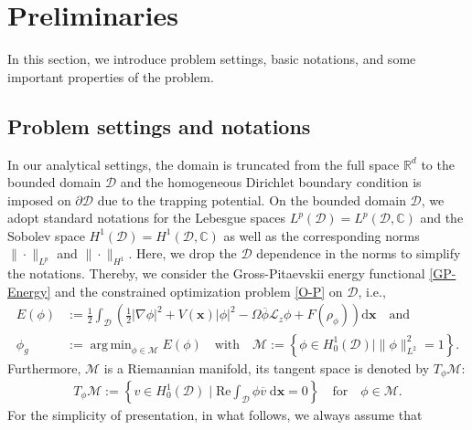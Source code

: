 \documentclass[preprint,3p]{elsarticle}
\DeclareMathOperator*{\argmin}{arg\,min}
\begin{document}
\section{Preliminaries}\label{Sec2}
In this section, we introduce problem settings, basic notations, and some important properties of the problem. 

\subsection{Problem settings and notations}
In our analytical settings, the domain is truncated from the full space $\mathbb{R}^d$ to the bounded domain $\mathcal{D}$ and the homogeneous Dirichlet boundary condition is imposed on $\partial\mathcal{D}$ due to the trapping potential. On the bounded domain $\mathcal{D}$, we adopt standard notations for the Lebesgue spaces $L^p(\mathcal{D})=L^p(\mathcal{D},\mathbb{C})$ and the Sobolev space $H^1(\mathcal{D})=H^1(\mathcal{D},\mathbb{C})$ as well as the corresponding norms $\|\cdot\|_{L^p}$ and $\|\cdot\|_{H^1}$. Here, we drop the $\mathcal{D}$ dependence in the norms to simplify the notations. Thereby, we consider the Gross-Pitaevskii energy functional \eqref{GP-Energy} and the constrained optimization problem \eqref{O-P} on $\mathcal{D}$, i.e.,
\begin{align}\label{Riem-Opt-Problem}
	\nonumber E(\phi)&:=\frac{1}{2}\int_{\mathcal{D}}\left(\frac{1}{2}|\nabla\phi|^2+V(\bm{x})|\phi|^2
	-\Omega\overline{\phi} \mathcal{L}_z\phi+F(\rho_{\phi})\right)\text{d}\bm{x}\quad\text{and}\\
	\phi_g&:=\argmin_{\phi\in\mathcal{M}} E(\phi)\quad
	\mbox{with} \quad  \mathcal{M}:=\left\{\phi\in H_0^1(\mathcal{D})\big|\|\phi\|_{L^2}^2=1\right\}.
\end{align}
Furthermore, $\mathcal{M}$ is a Riemannian manifold, its tangent space is denoted by \(T_{\phi}\mathcal{M}\):
{\begin{align}\label{Tangent-space}
	T_{\phi}\mathcal{M}:=\left\{v\in H^1_0(\mathcal{D})\;\Big|\;\text{Re}\int_{\mathcal{D}}\phi\overline{v}\;\text{d}\bm{x}=0\right\}\quad\text{for}\quad \phi\in\mathcal{M}.
\end{align}}
For the simplicity of presentation, in what follows, we always assume that\\
\end{document}
